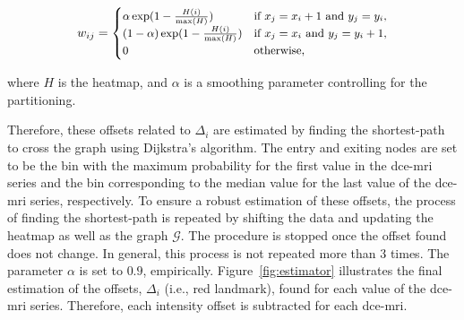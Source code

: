 \documentclass[a4paper,num-refs]{wiley-article}
\begin{document}
\begin{equation}\small
  w_{ij} = \begin{cases}
    \alpha \exp(1 - \frac{H(i)}{\max(H)})       & \text{if } x_j = x_i + 1 \text{ and } y_j = y_i, \\
    (1 - \alpha) \exp(1 - \frac{H(i)}{\max(H)}) & \text{if } x_j = x_i \text{ and } y_j = y_i + 1, \\
    0                                           & \text{otherwise},
  \end{cases}
  \label{eq:weight}
\end{equation}

\noindent where $H$ is the heatmap, and $\alpha$ is a smoothing parameter
controlling for the partitioning.

Therefore, these offsets related to $\Delta_i$ are estimated by finding the
shortest-path to cross the graph using Dijkstra's algorithm.  The entry and
exiting nodes are set to be the bin with the maximum probability for the first
value in the \ac{dce}-\ac{mri} series and the bin corresponding to the median
value for the last value of the \ac{dce}-\ac{mri} series, respectively.  To
ensure a robust estimation of these offsets, the process of finding the
shortest-path is repeated by shifting the data and updating the heatmap as well
as the graph $\mathcal{G}$. The procedure is stopped once the offset found does
not change. In general, this process is not repeated more than 3 times.  The
parameter $\alpha$ is set to $0.9$, empirically. Figure~\ref{fig:estimator}
illustrates the final estimation of the offsets, $\Delta_i$ (i.e., red
landmark), found for each value of the \ac{dce}-\ac{mri} series.  Therefore,
each intensity offset is subtracted for each \ac{dce}-\ac{mri}.
\end{document}

